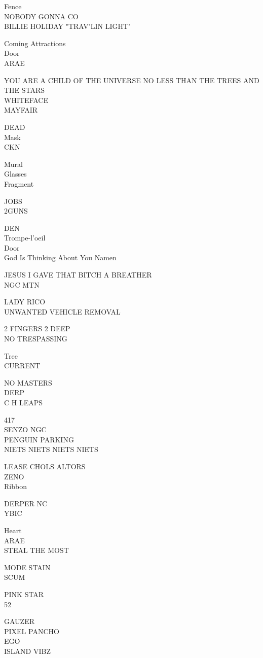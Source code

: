 \documentclass[10pt,letterpaper]{article}
\begin{document}
Fence\\
NOBODY GONNA CO\\
BILLIE HOLIDAY "TRAV'LIN LIGHT"

Coming Attractions\\
Door\\
ARAE

YOU ARE A CHILD OF THE UNIVERSE NO LESS THAN THE TREES AND THE STARS\\
WHITEFACE\\
MAYFAIR

DEAD\\
Mask\\
CKN

Mural\\
Glasses\\
Fragment

JOBS\\
2GUNS

DEN\\
Trompe{-}l'oeil\\
Door\\
God Is Thinking About You Namen

JESUS I GAVE THAT BITCH A BREATHER\\
NGC MTN

LADY RICO\\
UNWANTED VEHICLE REMOVAL

2 FINGERS 2 DEEP\\
NO TRESPASSING

Tree\\
CURRENT

NO MASTERS\\
DERP\\
C H LEAPS

417\\
SENZO NGC\\
PENGUIN PARKING\\
NIETS NIETS NIETS NIETS

LEASE CHOLS ALTORS\\
ZENO\\
Ribbon

DERPER NC\\
YBIC

Heart\\
ARAE\\
STEAL THE MOST

MODE STAIN\\
SCUM

PINK STAR\\
52

GAUZER\\
PIXEL PANCHO\\
EGO\\
ISLAND VIBZ
\end{document}
